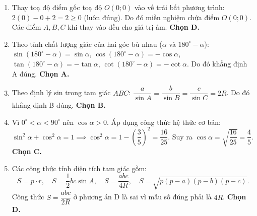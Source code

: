 \documentclass[12pt,a4paper]{article}
\begin{document}
\begin{enumerate}
\item Thay toạ độ điểm gốc toạ độ $O(0; 0)$ vào vế trái bất phương trình: $2(0) - 0 + 2 = 2 \ge 0$ (luôn đúng). Do đó miền nghiệm chứa điểm $O(0; 0)$. Các điểm $A, B, C$ khi thay vào đều cho giá trị âm. \textbf{Chọn D.}

\item Theo tính chất lượng giác của hai góc bù nhau ($\alpha$ và $180^\circ - \alpha$):
$\sin(180^\circ - \alpha) = \sin \alpha$, $\cos(180^\circ - \alpha) = -\cos \alpha$, $\tan(180^\circ - \alpha) = -\tan \alpha$, $\cot(180^\circ - \alpha) = -\cot \alpha$. Do đó khẳng định A đúng. \textbf{Chọn A.}

\item Theo định lý sin trong tam giác $ABC$: $\dfrac{a}{\sin A} = \dfrac{b}{\sin B} = \dfrac{c}{\sin C} = 2R$. Do đó khẳng định B đúng. \textbf{Chọn B.}

\item Vì $0^\circ < \alpha < 90^\circ$ nên $\cos \alpha > 0$.
Áp dụng công thức hệ thức cơ bản: $\sin^2 \alpha + \cos^2 \alpha = 1 \implies \cos^2 \alpha = 1 - \left(\dfrac{3}{5}\right)^2 = \dfrac{16}{25}$.
Suy ra $\cos \alpha = \sqrt{\dfrac{16}{25}} = \dfrac{4}{5}$. \textbf{Chọn C.}

\item Các công thức tính diện tích tam giác gồm:
\[
S = p \cdot r, \quad S = \dfrac{1}{2}bc \sin A, \quad S = \dfrac{abc}{4R}, \quad S = \sqrt{p(p-a)(p-b)(p-c)}.
\]
Công thức $S = \dfrac{abc}{2R}$ ở phương án D là sai vì mẫu số đúng phải là $4R$. \textbf{Chọn D.}
\end{enumerate}
\end{document}
